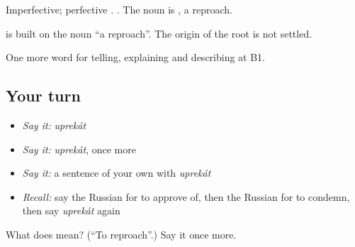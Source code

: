 Imperfective; perfective \emph{}. \emph{   }. The noun is \emph{}, a reproach.

\begin{cousinweb}
\textbf{} is built on the noun \emph{} \textquotedblleft{}a reproach\textquotedblright{}. The origin of the root is not settled.
\end{cousinweb}

\begin{grammarlens}[title={What you've built}]
One more word for telling, explaining and describing at B1.
\end{grammarlens}

\subsection*{Your turn}
\begin{itemize}
\raggedright
  \item \emph{Say it:} \emph{uprekát}
  \item \emph{Say it:} \emph{uprekát}, once more
  \item \emph{Say it:} a sentence of your own with \emph{uprekát}
  \item \emph{Recall:} say the Russian for to approve of, then the Russian for to condemn, then say \emph{uprekát} again
\end{itemize}

\begin{tcolorbox}[breakable,colback=teal!4,colframe=teal!35!black,title={Before you move on}]
What does  mean? (\textquotedblleft{}To reproach\textquotedblright{}.) Say it once more.
\end{tcolorbox}
